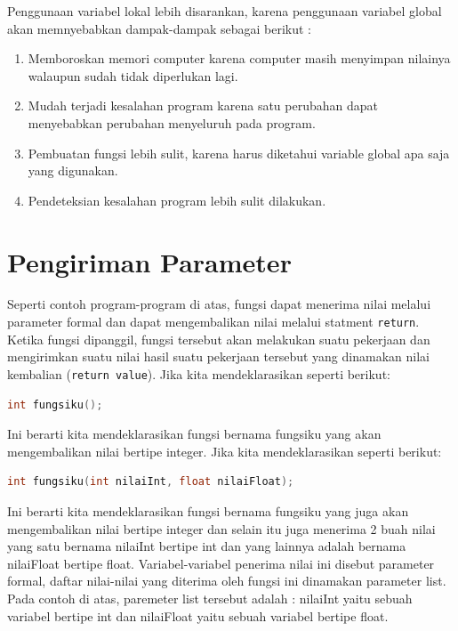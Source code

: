 Penggunaan variabel lokal lebih disarankan, karena penggunaan variabel
global akan memnyebabkan dampak-dampak sebagai berikut :

\begin{enumerate}


\item
  Memboroskan memori computer karena computer masih menyimpan nilainya
  walaupun sudah tidak diperlukan lagi.
\item
  Mudah terjadi kesalahan program karena satu perubahan dapat
  menyebabkan perubahan menyeluruh pada program.
\item
  Pembuatan fungsi lebih sulit, karena harus diketahui variable global
  apa saja yang digunakan.
\item
  Pendeteksian kesalahan program lebih sulit dilakukan.
\end{enumerate}

\section{Pengiriman Parameter}\label{pengiriman-parameter}

Seperti contoh program-program di atas, fungsi dapat menerima nilai
melalui parameter formal dan dapat mengembalikan nilai melalui statment
\texttt{return}. Ketika fungsi dipanggil, fungsi tersebut akan melakukan
suatu pekerjaan dan mengirimkan suatu nilai hasil suatu pekerjaan
tersebut yang dinamakan nilai kembalian (\texttt{return\ value}). Jika
kita mendeklarasikan seperti berikut:

\begin{lstlisting}[language=c++, numbers=none]
int fungsiku();  
\end{lstlisting}

Ini berarti kita mendeklarasikan fungsi bernama fungsiku yang akan
mengembalikan nilai bertipe integer. Jika kita mendeklarasikan seperti
berikut:

\begin{lstlisting}[language=c++, numbers=none]
int fungsiku(int nilaiInt, float nilaiFloat);  
\end{lstlisting}

Ini berarti kita mendeklarasikan fungsi bernama fungsiku yang juga akan
mengembalikan nilai bertipe integer dan selain itu juga menerima 2 buah
nilai yang satu bernama nilaiInt bertipe int dan yang lainnya adalah
bernama nilaiFloat bertipe float. Variabel-variabel penerima nilai ini
disebut parameter formal, daftar nilai-nilai yang diterima oleh fungsi
ini dinamakan parameter list. Pada contoh di atas, paremeter list
tersebut adalah : nilaiInt yaitu sebuah variabel bertipe int dan
nilaiFloat yaitu sebuah variabel bertipe float.

